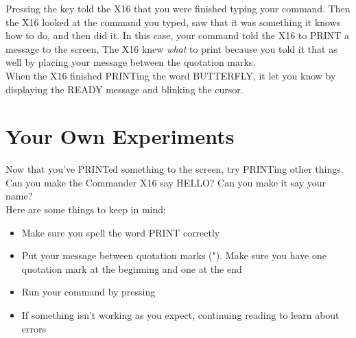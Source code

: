
Pressing the  key told the X16 that you were finished typing
your command.  Then the X16 looked at the command you typed, saw that it was
something it knows how to do, and then did it.  In this case, your command told
the X16 to {\ttfamily PRINT} a message to the screen,  The X16 knew \emph{what}
to print because you told it that as well by placing your message between the
quotation marks.\\

When the X16 finished {\ttfamily PRINT}ing the word {\ttfamily BUTTERFLY}, it
let you know by displaying the {\ttfamily READY} message and blinking the
cursor.\\

\section{Your Own Experiments}

Now that you've {\ttfamily PRINT}ed something to the screen, try {\ttfamily
PRINT}ing other things.  Can you make the Commander X16 say {\ttfamily HELLO}?
Can you make it say your name?\\

Here are some things to keep in mind:

\begin{itemize}
	\item Make sure you spell the word {\ttfamily PRINT} correctly
	\item Put your message between quotation marks ({\ttfamily "}).  Make sure
		you have one quotation mark at the beginning and one at the end
	\item Run your command by pressing 
	\item If something isn't working as you expect, continuing reading to learn about errors
\end{itemize}

